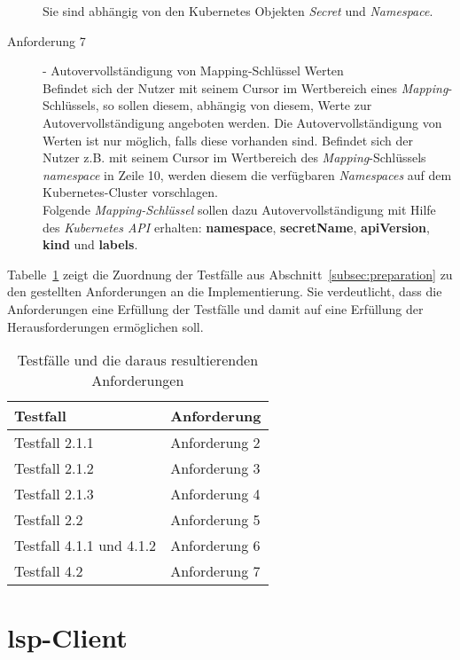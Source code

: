 \begin{description}
        Sie sind abhängig von den Kubernetes Objekten \textit{Secret} und \textit{Namespace}.
  \item[Anforderung 7]{- Autovervollständigung von Mapping-Schlüssel Werten\\}
        Befindet sich der Nutzer mit seinem Cursor im Wertbereich eines \textit{Mapping}-Schlüssels, so sollen diesem, abhängig von diesem, Werte zur Autovervollständigung
        angeboten werden. Die Autovervollständigung von Werten ist nur möglich, falls diese vorhanden sind.
        Befindet sich der Nutzer z.B. mit seinem Cursor im Wertbereich des \textit{Mapping}-Schlüssels \textit{namespace} in Zeile 10,
        werden diesem die verfügbaren \textit{Namespaces} auf dem Kubernetes-Cluster vorschlagen.
        \\
        Folgende \textit{Mapping-Schlüssel} sollen dazu Autovervollständigung mit Hilfe des \textit{Kubernetes API} erhalten:
        \textbf{namespace}, \textbf{secretName}, \textbf{apiVersion}, \textbf{kind} und \textbf{labels}.
\end{description}

Tabelle~\ref{tbl:test-cases-and-requirements} zeigt die Zuordnung der Testfälle aus Abschnitt~\ref{subsec:preparation} zu den gestellten Anforderungen an die Implementierung.
Sie verdeutlicht, dass die Anforderungen eine Erfüllung der Testfälle und damit auf eine Erfüllung der Herausforderungen ermöglichen soll.

\begin{table}[h]
  \centering
  \begin{tabular}{ll}
    \toprule
    \textbf{Testfall}        & \textbf{Anforderung} \\
    \midrule
    Testfall 2.1.1           & Anforderung 2        \\
    Testfall 2.1.2           & Anforderung 3        \\
    Testfall 2.1.3           & Anforderung 4        \\
    Testfall 2.2             & Anforderung 5        \\
    Testfall 4.1.1 und 4.1.2 & Anforderung 6        \\
    Testfall 4.2             & Anforderung 7        \\
    \bottomrule
  \end{tabular}
  \caption{Testfälle und die daraus resultierenden Anforderungen}
  \label{tbl:test-cases-and-requirements}
\end{table}


\section{\acs{lsp}-Client}\label{sec:lsp-client}

